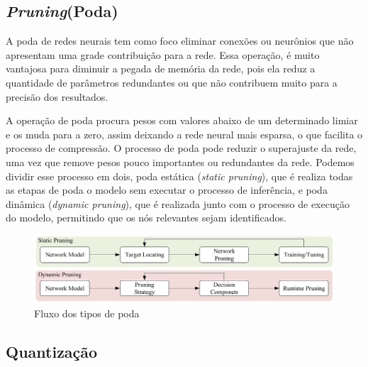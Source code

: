 \subsection{\textit{Pruning}(Poda)}\label{poda}

A poda de redes neurais tem como foco eliminar conexões ou neurônios que não apresentam uma grade contribuição para a
rede.
Essa operação, é muito vantajosa para diminuir a pegada de memória da rede, pois ela reduz a quantidade de parâmetros
redundantes ou que não contribuem muito para a precisão dos resultados.


A operação de poda procura pesos com valores abaixo de um determinado limiar e os muda para a zero, assim deixando
a rede neural mais esparsa, o que facilita o processo de compressão.
O processo de poda pode reduzir o superajuste da rede, uma vez que remove pesos pouco importantes ou redundantes
da rede.
Podemos dividir esse processo em dois, poda estática (\textit{static pruning}), que é realiza todas as etapas de poda
o modelo sem executar o processo de inferência, e poda dinâmica (\textit{dynamic pruning}), que é realizada junto com
o processo de execução do modelo, permitindo que os nós relevantes sejam identificados.

\begin{figure}[htb]
	\caption {\label{cap_conceitos_tipos_poda}Fluxo dos tipos de poda}
	\begin{center}
		\includegraphics[scale=0.5]{Imagens/categorias-poda}
	\end{center}
\end{figure}


\subsection{Quantização}\label{quantizacao}


